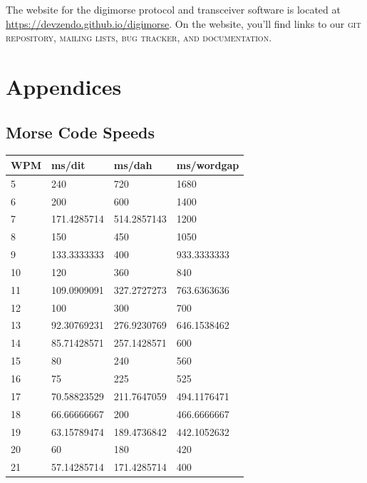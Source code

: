 \documentclass[a4paper]{tufte-handout}
\newcommand{\textls}[2][5]{%
    \begingroup\addfontfeatures{LetterSpace=#1}#2\endgroup
  }
\renewcommand{\smallcapsspacing}[1]{\textls[10]{#1}}
\renewcommand{\smallcaps}[1]{\smallcapsspacing{\scshape\MakeTextLowercase{#1}}}
\begin{document}
The website for the digimorse protocol and transceiver software is located at
\url{https://devzendo.github.io/digimorse}. On the website, you'll find
links to our \smallcaps{git} repository, mailing lists, bug tracker, and documentation.

\pagebreak
\appendix
\section*{Appendices}
\renewcommand{\thesubsection}{\Alph{subsection}}

\subsection{Morse Code Speeds}

    \begin{table}[!h]
        \footnotesize
        \centering
        \selectfont
        \begin{tabular}{llll}
            \toprule
            WPM & ms/dit & ms/dah & ms/wordgap \\
            \midrule
            5 & 240 & 720 & 1680 \\
            6 & 200 & 600 & 1400 \\
            7 & 171.4285714 & 514.2857143 & 1200 \\
            8 & 150 & 450 & 1050 \\
            9 & 133.3333333 & 400 & 933.3333333 \\
            10 & 120 & 360 & 840 \\
            11 & 109.0909091 & 327.2727273 & 763.6363636 \\
            12 & 100 & 300 & 700 \\
            13 & 92.30769231 & 276.9230769 & 646.1538462 \\
            14 & 85.71428571 & 257.1428571 & 600 \\
            15 & 80 & 240 & 560 \\
            16 & 75 & 225 & 525 \\
            17 & 70.58823529 & 211.7647059 & 494.1176471 \\
            18 & 66.66666667 & 200 & 466.6666667 \\
            19 & 63.15789474 & 189.4736842 & 442.1052632 \\
            20 & 60 & 180 & 420 \\
            21 & 57.14285714 & 171.4285714 & 400 \\

\end{tabular}
\end{table}
\end{document}
